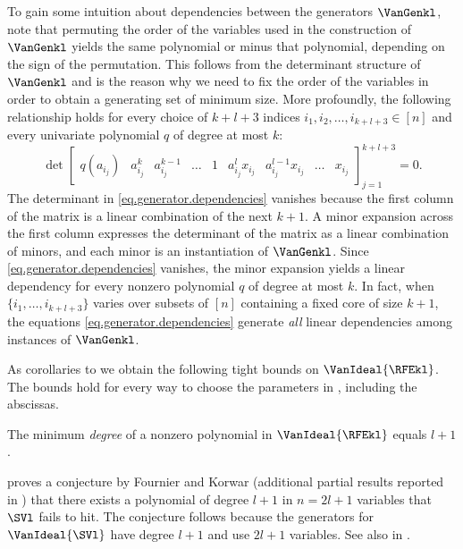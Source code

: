 \documentclass{toc}
\begin{document}
To gain some intuition about dependencies between the generators $\VanGenkl$,
note that permuting the order of the variables used in the construction of
$\VanGenkl$ yields the same polynomial or minus that polynomial,
depending on the sign of the permutation.
This follows from the determinant structure of $\VanGenkl$
and is the reason why we need to fix the order of the variables in order to
obtain a generating set of minimum size.
More profoundly,
the following relationship holds for every choice of $k+l+3$ indices
$i_1, i_2, \dots, i_{k+l+3} \in [n]$
and every univariate polynomial $q$ of degree at most $k$:
\begin{equation}\label{eq.generator.dependencies}
  \det
  \begin{bmatrix}
    q(a_{i_j}) & 
    a_{i_j}^{k} & a_{i_j}^{k-1} & \dots & 1 & 
    a_{i_j}^l x_{i_j} & a_{i_j}^{l-1}x_{i_j} & \dots & x_{i_j}
  \end{bmatrix}_{j=1}^{k+l+3} = 0.
\end{equation}
The determinant in \eqref{eq.generator.dependencies} vanishes because the
first column of the matrix is a linear combination of the next $k+1$.
A minor expansion across the first column expresses the determinant
of the matrix as a linear combination of minors,
and each minor is an instantiation of $\VanGenkl$.
Since \eqref{eq.generator.dependencies} vanishes, the minor expansion yields a linear dependency for every nonzero polynomial $q$ of degree at most $k$.
In fact,
when \(\{i_1,\ldots,i_{k+l+3}\}\) varies over subsets of \([n]\) containing a
fixed core of size \(k+1\),
the equations \eqref{eq.generator.dependencies} generate \emph{all} linear
dependencies among instances of $\VanGenkl$.

As corollaries to 
we obtain the following tight bounds on $\VanIdeal{\RFEkl}$.
The bounds hold for every way to choose the parameters in , including the abscissas.
\begin{corollary}
    \label{cor.rfe.degree}
    The minimum {\em degree} of a nonzero polynomial in $\VanIdeal{\RFEkl}$
    equals $l+1$.
\end{corollary}
 proves a conjecture by Fournier and Korwar \cite{FournierKorwar2018}
(additional partial results reported in \cite{Korwar2021}) that there
exists a polynomial of degree $l+1$ in $n=2l+1$ variables that $\SVl$
fails to hit.
The conjecture follows because the generators for $\VanIdeal{\SVl}$ have
degree $l+1$ and use $2l+1$ variables.
See also  in .
\end{document}
